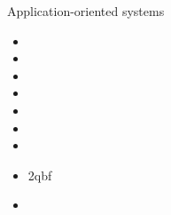 \begin{frame}{Application-oriented systems}
  \begin{itemize}
  \item \aspartame
  \item \aspcud
  \item \asprilo
  \item \chasp
  \item \flatzingo
  \item \fluto
  \item \plasp
  \item \qasp2qbf
  \item \teaspoon
  \end{itemize}
\end{frame}
%
